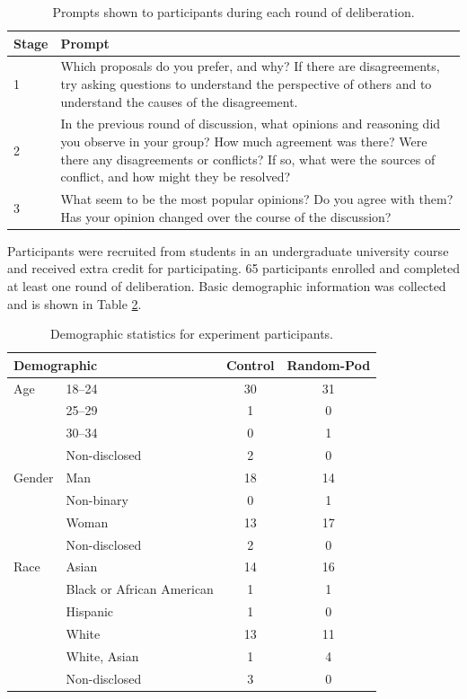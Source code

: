\begin{table}
\center
\begin{tabular}{|p{0.5in}|p{4.5in}|}
\hline
Stage & Prompt \\
\hline
1 &
Which proposals do you prefer, and why?
If there are disagreements, try asking questions to understand the perspective
of others and to understand the causes of the disagreement.
\\
\hline
2 & In the previous round of discussion, what opinions and reasoning did you
observe in your group?
How much agreement was there?
Were there any disagreements or conflicts?
If so, what were the sources of conflict, and how might they be resolved?
\\
\hline
3 &
What seem to be the most popular opinions?
Do you agree with them?
Has your opinion changed over the course of the discussion?
\\
\hline
\end{tabular}
\caption{Prompts shown to participants during each round of deliberation.}
\label{tab:prompts}
\end{table}

Participants were recruited from students in an undergraduate university course and received extra credit for participating. 65 participants enrolled and completed at least one round of deliberation.
Basic demographic information was collected and is shown in Table \ref{tab:demographic}.

\begin{table}[]
    \centering
    \begin{tabular}{l l c c}
\hline
\multicolumn{2}{l}{Demographic} & Control & Random-Pod\\
\hline
Age & 18--24 & 30 & 31 \\
& 25--29 & 1 & 0 \\
& 30--34 & 0 & 1 \\
& Non-disclosed & 2 & 0 \\
\hline
Gender & Man & 18 & 14 \\
& Non-binary & 0 & 1 \\
& Woman & 13 & 17 \\
& Non-disclosed & 2 & 0 \\
\hline
Race & Asian & 14 & 16 \\
& Black or African American & 1 & 1 \\
& Hispanic & 1 & 0 \\
& White & 13 & 11 \\
& White, Asian & 1 & 4 \\
& Non-disclosed & 3 & 0 \\
\hline
    \end{tabular}
    \caption{Demographic statistics for experiment participants.}
    \label{tab:demographic}
\end{table}

